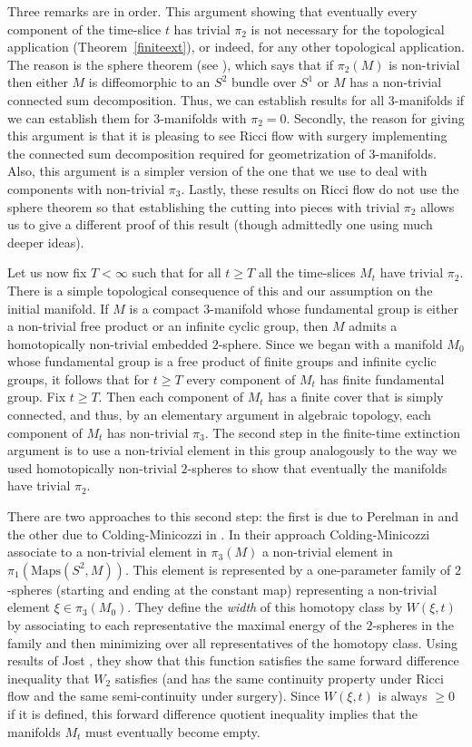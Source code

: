 Three remarks are in order. This argument showing that eventually
every component of the time-slice $t$ has trivial $\pi_2$ is not
necessary for the topological application (Theorem~\ref{finiteext}),
or indeed, for any other topological application. The reason is the
sphere theorem (see \cite{Hempel}), which says that if $\pi_2(M)$ is
non-trivial then either $M$ is diffeomorphic to an $S^2$ bundle over
$S^1$ or $M$ has a non-trivial connected sum decomposition. Thus, we
can establish results for all $3$-manifolds if we can establish them
for $3$-manifolds with $\pi_2=0$. Secondly, the reason for giving
this argument is that it is pleasing to see Ricci flow with surgery
implementing the connected sum decomposition required for
geometrization of $3$-manifolds. Also, this argument is a simpler
version of the one that we use to deal with components with
non-trivial $\pi_3$. Lastly, these results on Ricci flow do not use
the sphere theorem so that establishing the cutting into pieces with
trivial $\pi_2$ allows us to give a different proof of this result
(though admittedly one using much deeper ideas).



Let us now fix $T<\infty$ such that for all  $t\ge T$ all the
time-slices $M_t$ have trivial $\pi_2$. There is a simple
topological consequence of this and our assumption on the initial
manifold. If $M$ is a compact $3$-manifold whose fundamental group
is either a non-trivial free product or an infinite cyclic group,
then $M$ admits a homotopically non-trivial embedded $2$-sphere.
Since we began with a manifold $M_0$ whose fundamental group is a
free product of finite groups and infinite cyclic groups, it follows
that for $t\ge T$ every component of $M_t$ has finite fundamental
group.  Fix $t\ge T$. Then  each component of $M_t$ has a finite
cover that is simply connected, and thus, by an elementary argument
in algebraic topology, each component of $M_t$ has non-trivial
$\pi_3$. The second step in the finite-time extinction argument is
to use a non-trivial element in this group analogously to the way we
used homotopically non-trivial $2$-spheres to show that eventually
the manifolds have trivial $\pi_2$.

 There are two
approaches to this second step: the first is due to Perelman in
\cite{Perelman3} and the other due to Colding-Minicozzi in
\cite{ColdingMinicozzi}. In their approach Colding-Minicozzi
associate to a non-trivial element in $\pi_3(M)$ a non-trivial
element in $\pi_1(\mathrm{Maps}(S^2,M))$. This element is represented
by  a one-parameter family of $2$-spheres (starting and ending at
the constant map) representing a non-trivial element $\xi\in
\pi_3(M_0)$. They define the {\em width} of this homotopy class by
$W(\xi,t)$ by associating to each representative the maximal energy
of the $2$-spheres in the family and then minimizing over all
representatives of the homotopy class. Using results of Jost
\cite{Jost}, they show that this function satisfies the same forward
difference inequality that $W_2$ satisfies (and has the same
continuity property under Ricci flow and the same semi-continuity
under surgery). Since $W(\xi,t)$ is always $\ge 0$ if it is defined,
this forward difference quotient inequality implies that the
manifolds $M_t$ must eventually become empty.


